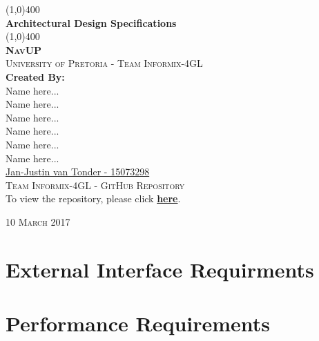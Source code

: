 \documentclass{article}
\begin{document}
	\begin{titlepage}
		\begin{center}

			\line(1,0){400}\\
			[6mm]
			\huge{
				\bfseries Architectural Design Specifications
			}\\
			[2mm]
			\line(1,0){400}\\
			[15mm]
			\textsc{\large{\textbf{NavUP}}}\\
			[4.5mm]
			\textsc{\large University of Pretoria - Team Informix-4GL}\\
			[20mm]
			\large{\textbf{Created By:}}\\
			[2mm]
			\large{
				Name here... \\
				Name here... \\
				Name here... \\
				Name here... \\
				Name here... \\
				Name here... \\
				\href{https://github.com/jan-justin}{Jan-Justin van Tonder - 15073298}
			}\\
			[30mm]
			
		\textsc{\Large Team Informix-4GL - GitHub Repository}\\[2mm]
			To view the repository, please click 
		\href{https://github.com/MarkKlingenberg/Informix-4gl}{\textbf{here}}. \\[45mm]
		\end{center}
		\begin{flushright}
			\textsc{\large 10 March 2017}
		\end{flushright}
	\end{titlepage}

	\cleardoublepage
	\thispagestyle{empty}
	\tableofcontents
	\cleardoublepage

	\thispagestyle{empty}
	\listoffigures
	\cleardoublepage
	\setcounter{page}{1}
	
	\section{External Interface Requirments}\label{sec:external-inteface-requirments}
	
	
		
	\clearpage
		

	\section{Performance Requirements}\label{sec:performance-requirements}
\end{document}
